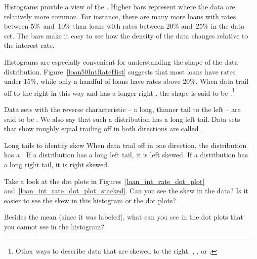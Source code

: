 Histograms provide a view of the .
Higher bars represent where the data are relatively more common.
For instance, there are many more loans with rates between
5\%~and~10\% than loans with rates between 20\% and~25\%
in the data set.
The bars make it easy to see how the density of the data
changes relative to the interest rate.

Histograms are especially convenient for understanding the
shape of the data distribution\label{shapeFirstDiscussed}.
Figure~\ref{loan50IntRateHist} suggests that most loans
have rates under 15\%, while only a handful
of loans have rates above 20\%.
When data trail off to the right in this way
and has a longer right ,
the shape is said to be
.\footnote{Other
  ways to describe data that are skewed to the right:
  ,
  ,
  or .}

Data sets with the reverse characteristic --
a long, thinner tail to the left --
are said to be .
We also say that such a distribution has a long left tail.
Data sets that show roughly equal trailing off in both
directions are called .

\begin{onebox}{Long tails to identify skew}
  When data trail off in one direction, the distribution
  has a . 
  If a distribution has a long left tail, it is left skewed.
  If a distribution has a long right tail, it is right skewed.
\end{onebox}

\D{\newpage}

\begin{exercisewrap}
\begin{nexercise}
Take a look at the dot plots in
Figures~\ref{loan_int_rate_dot_plot}
and~\ref{loan_int_rate_dot_plot_stacked}.
Can you see the skew in the data? Is it easier to see the
skew in this histogram or the dot plots?\footnotemark{}
\end{nexercise}
\end{exercisewrap}

\begin{exercisewrap}
\begin{nexercise}
Besides the mean (since it was labeled), what can you see
in the dot plots that you cannot see in the
histogram?\footnotemark{}
\end{nexercise}
\end{exercisewrap}

